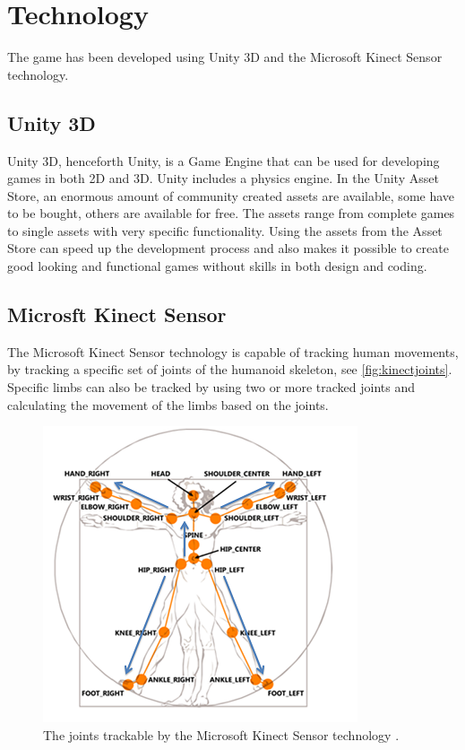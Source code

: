 \documentclass[11pt]{report}
\begin{document}
\section{Technology}
The game has been developed using Unity 3D and the Microsoft Kinect Sensor technology.

\subsection{Unity 3D}
Unity 3D, henceforth Unity, is a Game Engine that can be used for developing games in both 2D and 3D. Unity includes a physics engine. In the Unity Asset Store, an enormous amount of community created assets are available, some have to be bought, others are available for free. The assets range from complete games to single assets with very specific functionality. Using the assets from the Asset Store can speed up the development process and also makes it possible to create good looking and functional games without skills in both design and coding.

\subsection{Microsft Kinect Sensor}
The Microsoft Kinect Sensor technology is capable of tracking human movements, by tracking a specific set of joints of the humanoid skeleton, see \autoref{fig:kinectjoints}. Specific limbs can also be tracked by using two or more tracked joints and calculating the movement of the limbs based on the joints.

\begin{figure}[H]
\centering
\includegraphics{../GFX/joints.png}
\caption[Joints trackable by the Microsoft Kinect Sensor technology]{The joints trackable by the Microsoft Kinect Sensor technology \cite{kinectusertracking}.}
\label{fig:kinectjoints}
\end{figure}
\end{document}
